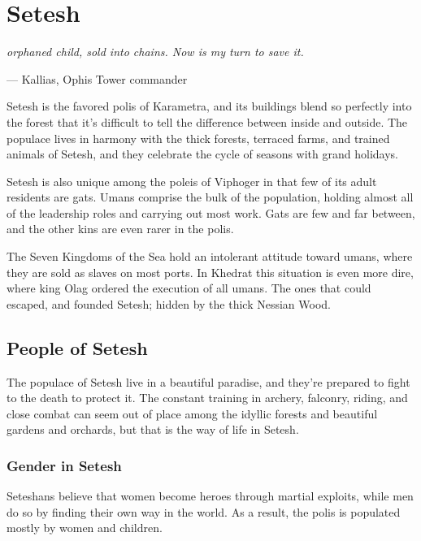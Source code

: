 \section{Setesh} \label{sec::setesh}
\textit{orphaned child, sold into chains.
Now is my turn to save it.}

\hspace*{\fill} --- Kallias, Ophis Tower commander

Setesh is the favored polis of Karametra, and its buildings blend so perfectly into the forest that it's difficult to tell the difference between inside and outside.
The populace lives in harmony with the thick forests, terraced farms, and trained animals of Setesh, and they celebrate the cycle of seasons with grand holidays.

Setesh is also unique among the poleis of Viphoger in that few of its adult residents are gats.
Umans comprise the bulk of the population, holding almost all of the leadership roles and carrying out most work.
Gats are few and far between, and the other kins are even rarer in the polis.

The Seven Kingdoms of the Sea hold an intolerant attitude toward umans, where they are sold as slaves on most ports.
In Khedrat this situation is even more dire, where king Olag ordered the execution of all umans.
The ones that could escaped, and founded Setesh; hidden by the thick Nessian Wood.


\subsection*{People of Setesh}
    The populace of Setesh live in a beautiful paradise, and they're prepared to fight to the death to protect it.
    The constant training in archery, falconry, riding, and close combat can seem out of place among the idyllic forests and beautiful gardens and orchards, but that is the way of life in Setesh.

    \subsubsection{Gender in Setesh}
        Seteshans believe that women become heroes through martial exploits, while men do so by finding their own way in the world.
        As a result, the polis is populated mostly by women and children.

